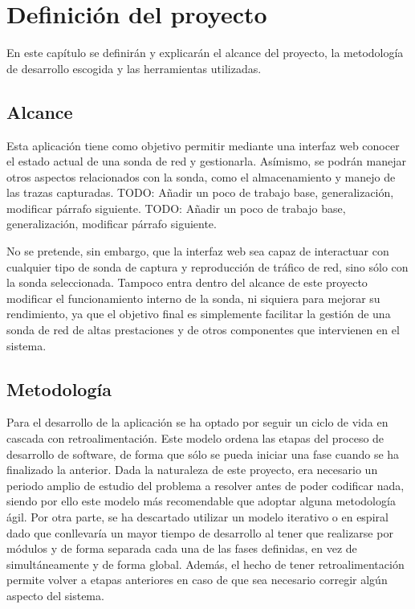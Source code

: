 \chapter{Definición del proyecto\label{cap:defProyecto}}

En este capítulo se definirán y explicarán el alcance del proyecto, la metodología de desarrollo escogida y las herramientas utilizadas.

\section{Alcance\label{sec:dp:alcance}}

Esta aplicación tiene como objetivo permitir mediante una interfaz web conocer el estado actual de una sonda de red y gestionarla.
Asímismo, se podrán manejar otros aspectos relacionados con la sonda, como el almacenamiento y manejo de las \glspl{traza} capturadas.
TODO: Añadir un poco de trabajo base, generalización, modificar párrafo siguiente.
TODO: Añadir un poco de trabajo base, generalización, modificar párrafo siguiente.

No se pretende, sin embargo, que la interfaz web sea capaz de interactuar con cualquier tipo de sonda de captura y reproducción de tráfico de red, sino sólo con la sonda seleccionada.
Tampoco entra dentro del alcance de este proyecto modificar el funcionamiento interno de la sonda, ni siquiera para mejorar su rendimiento, ya que el objetivo final es simplemente facilitar la gestión de una sonda de red de altas prestaciones y de otros componentes que intervienen en el sistema.

\section{Metodología\label{sec:dp:metodologia}}

Para el desarrollo de la aplicación se ha optado por seguir un ciclo de vida en cascada con retroalimentación.
Este modelo ordena las etapas del proceso de desarrollo de software, de forma que sólo se pueda iniciar una fase cuando se ha finalizado la anterior.
Dada la naturaleza de este proyecto, era necesario un periodo amplio de estudio del problema a resolver antes de poder codificar nada, siendo por ello este modelo más recomendable que adoptar alguna metodología ágil.
Por otra parte, se ha descartado utilizar un modelo iterativo o en espiral dado que conllevaría un mayor tiempo de desarrollo al tener que realizarse por módulos y de forma separada cada una de las fases definidas, en vez de simultáneamente y de forma global.
Además, el hecho de tener retroalimentación permite volver a etapas anteriores en caso de que sea necesario corregir algún aspecto del sistema.

